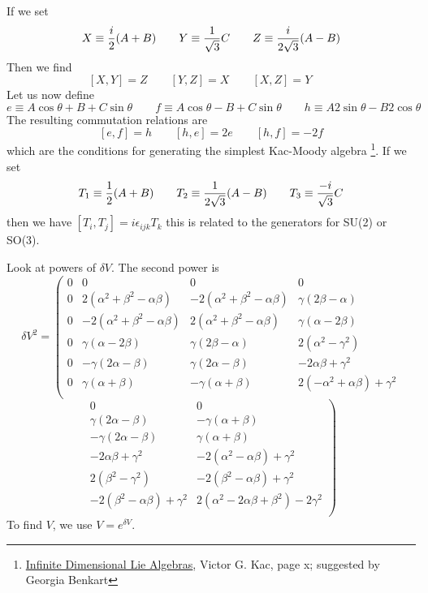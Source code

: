 \documentclass[12pt]{article}
\begin{document}
If we set
$$
X \equiv {i \over 2} (A+B) \quad \quad
Y \equiv {1 \over \sqrt{3}} C \quad \quad
Z \equiv {i \over 2 \sqrt{3}} (A-B)
$$
Then we find
$$
\left[ X,Y \right] = Z \quad\quad
\left[ Y,Z \right] = X \quad\quad
\left[ X,Z \right] = Y \quad\quad
$$
Let us now define
$$
e \equiv A \cos \theta + B + C \sin \theta \quad \quad
f \equiv A \cos \theta - B + C \sin \theta \quad \quad
h \equiv A 2 \sin \theta - B 2 \cos \theta
$$
The resulting commutation relations are
$$
\left[ e,f \right] = h \quad\quad
\left[ h,e \right] = 2 e \quad\quad
\left[ h,f \right] = -2f
$$
which are the conditions for generating the simplest Kac-Moody
algebra \footnote{\underline{Infinite Dimensional Lie Algebras},
Victor G. Kac, page x; suggested by Georgia Benkart}.
If we set
$$
T_1 \equiv {1 \over 2} (A+B) \quad \quad
T_2 \equiv {1 \over 2 \sqrt{3}} (A-B) \quad \quad
T_3 \equiv {-i \over \sqrt{3}} C
$$
then we have $\left[ T_i,T_j \right] = i \epsilon_{ijk} T_k$
this is related to the generators for SU(2) or SO(3).

 Look at powers of $\delta V$.  The second power is 
\begin{equation}
{\delta V}^2 = \left(
\begin{array}{cccc}
 0 &  0 &  0 &  0 \\
 0 &  2\left(\alpha^2+\beta^2-\alpha\beta\right) &  -2\left(\alpha^2+\beta^2-\alpha\beta\right)  &  
\gamma \left(2\beta-\alpha\right) \\
 0 &  -2\left(\alpha^2+\beta^2-\alpha\beta\right)  &  2\left(\alpha^2+\beta^2-\alpha\beta\right)  &
\gamma \left(\alpha-2\beta\right) \\
 0 &  \gamma \left(\alpha-2\beta\right) &  \gamma \left(2\beta-\alpha\right) &
2\left(\alpha^2-\gamma^2\right) \\
 0 &  -\gamma\left(2\alpha-\beta\right) &  \gamma\left(2\alpha-\beta\right) &
-2\alpha\beta+\gamma^2 \\
0 &  \gamma\left(\alpha+\beta\right)  &  -\gamma\left(\alpha+\beta\right) &
2\left(-\alpha^2+\alpha\beta\right)+\gamma^2 \\
\end{array} \right.
\end{equation}
$$
\left.
\begin{array}{cc}
 0 &  0 \\
\gamma\left(2\alpha-\beta\right) &  -\gamma\left(\alpha+\beta\right) \\
-\gamma\left(2\alpha-\beta\right) & \gamma\left(\alpha+\beta\right) \\
-2\alpha\beta+\gamma^2 &  -2\left(\alpha^2-\alpha\beta\right)+\gamma^2 \\
2\left(\beta^2-\gamma^2\right) & -2\left(\beta^2-\alpha\beta\right)+\gamma^2 \\
-2\left(\beta^2-\alpha\beta\right)+\gamma^2 & 
2\left(\alpha^2-2\alpha\beta+\beta^2\right)-2\gamma^2 \\
\end{array}
\right) 
$$
 To find $V$, we use $V = e^{\delta V}$.
\end{document}
